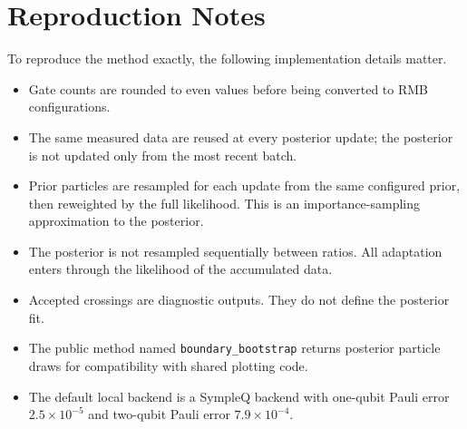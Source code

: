 \documentclass[11pt]{article}
\begin{document}
\section{Reproduction Notes}

To reproduce the method exactly, the following implementation details matter.

\begin{itemize}[leftmargin=*]
    \item Gate counts are rounded to even values before being converted to
    RMB configurations.
    \item The same measured data are reused at every posterior update; the
    posterior is not updated only from the most recent batch.
    \item Prior particles are resampled for each update from the same
    configured prior, then reweighted by the full likelihood. This is an
    importance-sampling approximation to the posterior.
    \item The posterior is not resampled sequentially between ratios. All
    adaptation enters through the likelihood of the accumulated data.
    \item Accepted crossings are diagnostic outputs. They do not define the
    posterior fit.
    \item The public method named \texttt{boundary\_bootstrap} returns
    posterior particle draws for compatibility with shared plotting code.
    \item The default local backend is a SympleQ backend with one-qubit Pauli
    error $2.5\times 10^{-5}$ and two-qubit Pauli error $7.9\times 10^{-4}$.
\end{itemize}
\end{document}
